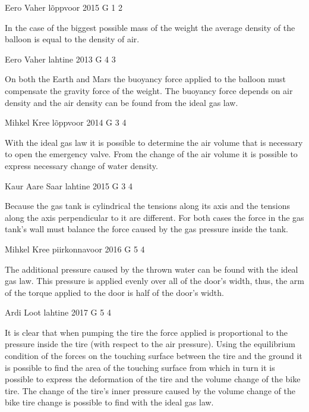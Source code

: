 \documentclass[11pt]{article}
\begin{document}
{Eero Vaher} %
{lõppvoor} %
{2015} %
{G 1} %
{2} %
{

\ifEngHint
In the case of the biggest possible mass of the weight the average density of the balloon is equal to the density of air.
\fi
}

{Eero Vaher} %
{lahtine} %
{2013} %
{G 4} %
{3} %
{

\ifEngHint
On both the Earth and Mars the buoyancy force applied to the balloon must compensate the gravity force of the weight. The buoyancy force depends on air density and the air density can be found from the ideal gas law.
\fi
}

{Mihkel Kree} %
{lõppvoor} %
{2014} %
{G 3} %
{4} %
{

\ifEngHint
With the ideal gas law it is possible to determine the air volume that is necessary to open the emergency valve. From the change of the air volume it is possible to express necessary change of water density.
\fi
}

{Kaur Aare Saar} %
{lahtine} %
{2015} %
{G 3} %
{4} %
{

\ifEngHint
Because the gas tank is cylindrical the tensions along its axis and the tensions along the axis perpendicular to it are different. For both cases the force in the gas tank’s wall must balance the force caused by the gas pressure inside the tank.
\fi
}

{Mihkel Kree} %
{piirkonnavoor} %
{2016} %
{G 5} %
{4} %
{

\ifEngHint
The additional pressure caused by the thrown water can be found with the ideal gas law. This pressure is applied evenly over all of the door's width, thus, the arm of the torque applied to the door is half of the door's width.
\fi
}

{Ardi Loot} %
{lahtine} %
{2017} %
{G 5} %
{4} %
{

\ifEngHint
It is clear that when pumping the tire the force applied is proportional to the pressure inside the tire (with respect to the air pressure). Using the equilibrium condition of the forces on the touching surface between the tire and the ground it is possible to find the area of the touching surface from which in turn it is possible to express the deformation of the tire and the volume change of the bike tire. The change of the tire's inner pressure caused by the volume change of the bike tire change is possible to find with the ideal gas law.
\fi
}
\end{document}
